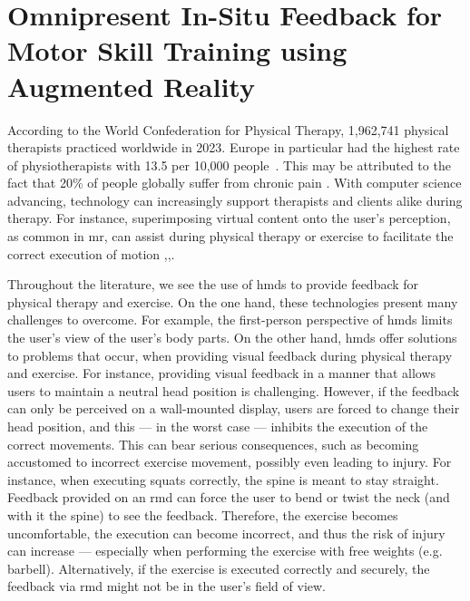 

\chapter[Omnipresent In-Situ Feedback for Motor Skill Training using AR]{Omnipresent In-Situ Feedback for Motor Skill Training using Augmented Reality \label{chap:omnipresent}}
According to the World Confederation for Physical Therapy, 1,962,741 physical therapists practiced worldwide in 2023. Europe in particular had the highest rate of physiotherapists with 13.5 per 10,000 people~\cite{worldphysiotherapy2023global}. This may be attributed to the fact that 20\% of people globally suffer from chronic pain \cite{treede2015classification}. With computer science advancing, technology can increasingly support therapists and clients alike during therapy. For instance, superimposing virtual content onto the user's perception, as common in \acrshort{mr}, can assist during physical therapy or exercise to facilitate the correct execution of motion \cite{brepohl2023virtual},\cite{campo2021immersive},\cite{diller2022vcb}.

Throughout the literature, we see the use of \acrshort{hmd}s to provide feedback for physical therapy and exercise. On the one hand, these technologies present many challenges to overcome. For example, the first-person perspective of \acrshort{hmd}s limits the user’s view of the user's body parts. On the other hand, \acrshort{hmd}s offer solutions to problems that occur, when providing visual feedback during physical therapy and exercise. For instance, providing visual feedback in a manner that allows users to maintain a neutral head position is challenging. However, if the feedback can only be perceived on a wall-mounted display, users are forced to change their head position, and this --- in the worst case --- inhibits the execution of the correct movements. This can bear serious consequences, such as becoming accustomed to incorrect exercise movement, possibly even leading to injury. For instance, when executing squats correctly, the spine is meant to stay straight. Feedback provided on an \acrshort{rmd} can force the user to bend or twist the neck (and with it the spine) to see the feedback. Therefore, the exercise becomes uncomfortable, the execution can become incorrect, and thus the risk of injury can increase --- especially when performing the exercise with free weights (e.g. barbell). Alternatively, if the exercise is executed correctly and securely, the feedback via \acrshort{rmd} might not be in the user's field of view.

